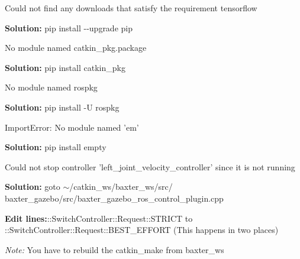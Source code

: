 \begin{DoxyEnumerate}
\item Could not find any downloads that satisfy the requirement tensorflow

{\bfseries Solution\-:} {\ttfamily pip install -\/-\/upgrade pip}
\item No module named catkin\-\_\-pkg.\-package

{\bfseries Solution\-:} {\ttfamily pip install catkin\-\_\-pkg}
\item No module named rospkg

{\bfseries Solution\-:} {\ttfamily pip install -\/\-U rospkg}
\item Import\-Error\-: No module named 'em'

{\bfseries Solution\-:} {\ttfamily pip install empty}
\item Could not stop controller 'left\-\_\-joint\-\_\-velocity\-\_\-controller' since it is not running

{\bfseries Solution\-:} goto {\ttfamily $\sim$/catkin\-\_\-ws/baxter\-\_\-ws/src/ baxter\-\_\-gazebo/src/baxter\-\_\-gazebo\-\_\-ros\-\_\-control\-\_\-plugin.\-cpp}

{\bfseries Edit lines\-:}{\ttfamily \-::\-Switch\-Controller\-::\-Request\-::\-S\-T\-R\-I\-C\-T to \-::\-Switch\-Controller\-::\-Request\-::\-B\-E\-S\-T\-\_\-\-E\-F\-F\-O\-R\-T} (This happens in two places)

{\itshape Note\-:} You have to rebuild the catkin\-\_\-make from baxter\-\_\-ws 
\end{DoxyEnumerate}